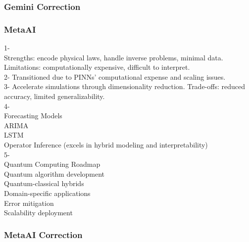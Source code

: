 \subsubsection{Gemini Correction}
\begin{tcolorbox}[breakable]
    
\end{tcolorbox}
\subsubsection{MetaAI}
\begin{tcolorbox}[breakable]
1-\\
Strengths: encode physical laws, handle inverse problems, minimal data.\\
Limitations: computationally expensive, difficult to interpret.\\
2- Transitioned due to PINNs' computational expense and scaling issues.\\
3- Accelerate simulations through dimensionality reduction. Trade-offs: reduced accuracy, limited generalizability.\\
4-\\
Forecasting Models\\
ARIMA\\
LSTM\\
Operator Inference (excels in hybrid modeling and interpretability)\\
5-\\
Quantum Computing Roadmap\\
Quantum algorithm development\\
Quantum-classical hybrids\\
Domain-specific applications\\
Error mitigation\\
Scalability deployment\\
\end{tcolorbox}
\subsubsection{MetaAI Correction}
\begin{tcolorbox}[breakable]
    
\end{tcolorbox}
\pagebreak